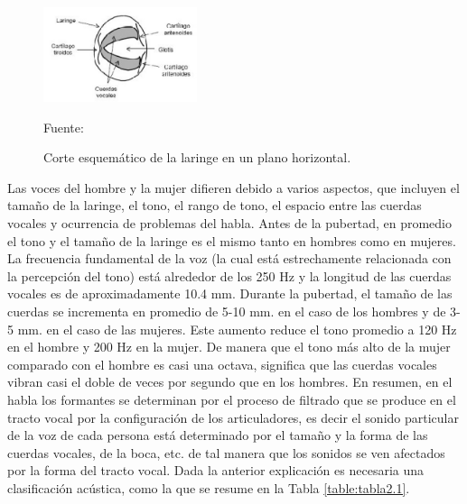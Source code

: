 \begin{enumerate}
\begin{figure}[ht]
\begin{center}
\includegraphics[width=0.4\textwidth]{Imagenes/Cap2/image002}
\end{center}
\begin{center}
\vskip -0.5cm
\caption{\small{Corte esquemático de la laringe en un plano horizontal.}}
\label{fig:figura2.2}
{\small{Fuente: \cite{owens}}}
\end{center}
\end{figure}

Las voces del hombre y la mujer difieren debido a varios aspectos, que incluyen el tamaño de la laringe, el tono, el rango de tono, el espacio entre las cuerdas vocales y ocurrencia de problemas del habla. Antes de la pubertad, en promedio el tono y el tamaño de la laringe es el mismo tanto en hombres como en mujeres. La frecuencia fundamental de la voz (la cual está estrechamente relacionada con la percepción del tono) está alrededor de los 250 Hz y la longitud de las cuerdas vocales es de aproximadamente 10.4 mm. 
\vskip 0.5cm
Durante la pubertad, el tamaño de las cuerdas se incrementa en promedio de 5-10 mm. en el caso de los hombres y de 3-5 mm. en el caso de las mujeres. Este aumento reduce el tono promedio a 120 Hz en el hombre y 200 Hz en la mujer. De manera que el tono más alto de la mujer comparado con el hombre es casi una octava, significa que las cuerdas vocales vibran casi el doble de veces por segundo que en los hombres.
\vskip 0.5cm
En resumen, en el habla los formantes se determinan por el proceso de filtrado que se produce en el tracto vocal por la configuración de los articuladores, es decir el sonido particular de la voz de cada persona está determinado por el tamaño y la forma de las cuerdas vocales, de la boca, etc. de tal manera que los sonidos se ven afectados por la forma del tracto vocal.
\vskip 0.5cm
Dada la anterior explicación es necesaria una clasificación acústica, como la que se resume en la Tabla \ref{table:tabla2.1}.


\end{enumerate}
